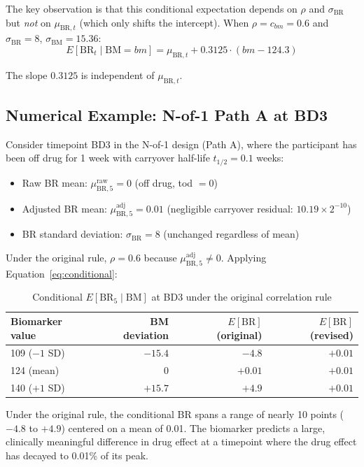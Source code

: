 \documentclass[11pt]{article}
\begin{document}
The key observation is that this conditional expectation
depends on $\rho$ and $\sigma_{\text{BR}}$ but \emph{not}
on $\mu_{\text{BR},t}$ (which only shifts the intercept).
When $\rho = c_{bm} = 0.6$ and $\sigma_{\text{BR}} = 8$,
$\sigma_{\text{BM}} = 15.36$:
\[
E[\text{BR}_t \mid \text{BM} = bm] =
  \mu_{\text{BR},t} + 0.3125 \cdot (bm - 124.3)
\]

The slope $0.3125$ is independent of $\mu_{\text{BR},t}$.

\subsection{Numerical Example: N-of-1 Path A at BD3}

Consider timepoint BD3 in the N-of-1 design (Path A), where the
participant has been off drug for 1 week with carryover
half-life $t_{1/2} = 0.1$ weeks:

\begin{itemize}[nosep]
\item Raw BR mean: $\mu_{\text{BR},5}^{\text{raw}} = 0$
  (off drug, tod $= 0$)
\item Adjusted BR mean: $\mu_{\text{BR},5}^{\text{adj}} = 0.01$
  (negligible carryover residual: $10.19 \times 2^{-10}$)
\item BR standard deviation: $\sigma_{\text{BR}} = 8$
  (unchanged regardless of mean)
\end{itemize}

Under the original rule, $\rho = 0.6$ because
$\mu_{\text{BR},5}^{\text{adj}} \neq 0$. Applying
Equation~\ref{eq:conditional}:

\begin{table}[h]
\centering
\caption{Conditional $E[\text{BR}_5 \mid \text{BM}]$ at
  BD3 under the original correlation rule}
\begin{tabular}{lrrr}
\toprule
Biomarker value & BM deviation & $E[\text{BR}]$
  (original) & $E[\text{BR}]$ (revised) \\
\midrule
109 ($-1$ SD) & $-15.4$ & $-4.8$ & $+0.01$ \\
124 (mean) & $0$ & $+0.01$ & $+0.01$ \\
140 ($+1$ SD) & $+15.7$ & $+4.9$ & $+0.01$ \\
\bottomrule
\end{tabular}
\label{tab:conditional}
\end{table}

Under the original rule, the conditional BR spans a range of
nearly 10 points ($-4.8$ to $+4.9$) centered on a mean of
0.01. The biomarker predicts a large, clinically meaningful
difference in drug effect at a timepoint where the drug effect
has decayed to 0.01\% of its peak.
\end{document}
